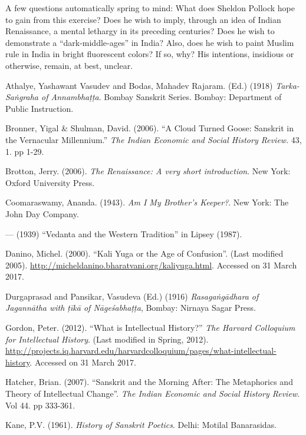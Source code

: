 A few questions automatically spring to mind: What does Sheldon Pollock hope to gain from this exercise? Does he wish to imply, through an idea of Indian Renaissance, a mental lethargy in its preceding centuries? Does he wish to demonstrate a “dark-middle-ages” in India? Also, does he wish to paint Muslim rule in India in bright fluorescent colors? If so, why? His intentions, insidious or otherwise, remain, at best, unclear. 

\begin{thebibliography}{99}
\itemsep=2pt
 Athalye, Yashawant Vasudev and Bodas, Mahadev Rajaram. (Ed.) (1918) {\sl Tarka-Saṅgraha of Annambhaṭṭa}. Bombay Sanskrit Series. Bombay: Department of Public Instruction. 

 Bronner, Yigal \& Shulman, David. (2006). “A Cloud Turned Goose: Sanskrit in the Vernacular Millennium.” {\sl The Indian Economic and Social History Review}. 43, 1. pp 1-29.

Brotton, Jerry. (2006). {\sl The Renaissance: A very short introduction}. New York: Oxford University Press. 

Coomaraswamy, Ananda. (1943). {\sl Am I My Brother’s Keeper?}. New York: The John Day Company. 

--- (1939) ``Vedanta and the Western Tradition'' in Lipsey (1987).

Danino, Michel. (2000). “Kali Yuga or the Age of Confusion”. (Last modified 2005). \url{http://micheldanino.bharatvani.org/kaliyuga.html}. Accessed on 31 March 2017.

Durgaprasad and Pansikar, Vasudeva (Ed.) (1916) {\sl Rasagaṅgādhara of Jagannātha with ṭīkā of Nāgeśabhaṭṭa}, Bombay: Nirnaya Sagar Press. 

Gordon, Peter. (2012). “What is Intellectual History?” {\sl The Harvard Colloquium for Intellectual History}. (Last modified in Spring, 2012). \url{http://projects.iq.harvard.edu/harvardcolloquium/pages/what-intellectual-history}. Accessed on 31 March 2017. 

 Hatcher, Brian. (2007). “Sanskrit and the Morning After: The Metaphorics and Theory of Intellectual Change”. {\sl The Indian Economic and Social History Review}. Vol 44. pp 333-361. 

 Kane, P.V. (1961). {\sl History of Sanskrit Poetics}.  Delhi: Motilal Banarasidas. 


\end{thebibliography}
